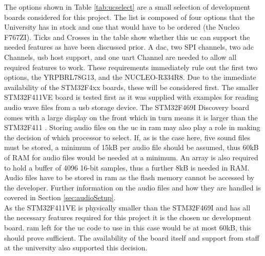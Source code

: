 \documentclass[12pt,a4paper]{report}
\begin{document}
The options shown in Table \ref{tab:ucselect} are a small selection of development boards considered for this project. The list is composed of four options that the University has in stock and one that would have to be ordered (the Nucleo F767ZI). Ticks and Crosses in the table show whether this \ac{uc} can support the needed features as have been discussed prior. A \ac{dac}, two SPI channels, two \ac{adc} Channels, \ac{usb} host support, and one \ac{uart} Channel are needed to allow all required features to work. These requirements immediately rule out the first two options, the YRPBRL78G13, and the NUCLEO-R334R8. Due to the immediate availability of the STM32F4xx boards, these will be considered first. The smaller STM32F411VE board is tested first as it was supplied with examples \cite{cubef4} for reading audio wave files from a \ac{usb} storage device. The STM32F469I Discovery board comes with a large display on the front which in turn means it is larger than the STM32F411 \cite{f411brd, f469brd}. Storing audio files on the \ac{uc} in \ac{ram} may also play a role in making the decision of which processor to select. If, as is the case here, five sound files must be stored, a minimum of 15kB per audio file should be assumed, thus 60kB of RAM for audio files would be needed at a minimum. An array is also required to hold a buffer of 4096 16-bit samples, thus a further 8kB is needed in RAM. Audio files have to be stored in \ac{ram} as the flash memory cannot be accessed by the developer. Further information on the audio files and how they are handled is covered in Section \ref{sec:audioSetup}.\\
As the STM32F411VE is physically smaller than the STM32F469I and has all the necessary features required for this project it is the chosen \ac{uc} development board. \ac{ram} left for the \ac{uc} code to use in this case would be at most 60kB, this should prove sufficient. The availability of the board itself and support from staff at the university also supported this decision.
\end{document}

